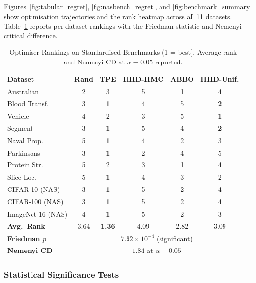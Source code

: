 \documentclass[11pt]{article}
\theoremstyle{definition}
\begin{document}
Figures~\ref{fig:tabular_regret}, \ref{fig:nasbench_regret}, and
\ref{fig:benchmark_summary} show optimisation trajectories and the
rank heatmap across all 11 datasets.
Table~\ref{tab:hpobench_rankings} reports per-dataset rankings with
the Friedman statistic and Nemenyi critical difference.

\begin{table}[H]
\centering
\caption{Optimiser Rankings on Standardised Benchmarks (1 = best).
         Average rank and Nemenyi CD at $\alpha=0.05$ reported.}
\label{tab:hpobench_rankings}
\begin{tabular}{lccccc}
\toprule
\textbf{Dataset} & \textbf{Rand} & \textbf{TPE}
                 & \textbf{HHD-HMC} & \textbf{ABBO} & \textbf{HHD-Unif.} \\
\midrule
Australian         & 2 & 3 & 5 & \textbf{1} & 4 \\
Blood Transf.      & 3 & \textbf{1} & 4 & 5 & \textbf{2} \\
Vehicle            & 4 & 2 & 3 & 5 & \textbf{1} \\
Segment            & 3 & \textbf{1} & 5 & 4 & \textbf{2} \\
\midrule
Naval Prop.        & 5 & \textbf{1} & 4 & 2 & 3 \\
Parkinsons         & 3 & \textbf{1} & 2 & 4 & 5 \\
Protein Str.       & 5 & 2 & 3 & \textbf{1} & 4 \\
Slice Loc.         & 5 & \textbf{1} & 4 & 3 & 2 \\
\midrule
CIFAR-10 (NAS)     & 3 & \textbf{1} & 5 & 2 & 4 \\
CIFAR-100 (NAS)    & 3 & \textbf{1} & 5 & 2 & 4 \\
ImageNet-16 (NAS)  & 4 & \textbf{1} & 5 & 2 & 3 \\
\midrule
\textbf{Avg.\ Rank} & 3.64 & \textbf{1.36} & 4.09 & 2.82 & 3.09 \\
\textbf{Friedman $p$} & \multicolumn{5}{c}{$7.92\times10^{-4}$ (significant)} \\
\textbf{Nemenyi CD} & \multicolumn{5}{c}{$1.84$ at $\alpha=0.05$} \\
\bottomrule
\end{tabular}
\end{table}

\subsubsection{Statistical Significance Tests}
\label{subsec:stats}
\end{document}
